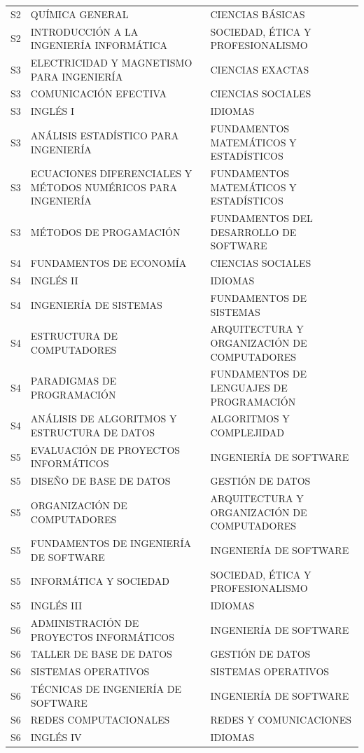 \documentclass[11pt,a4paper]{article}
\begin{document}
\begin{small}
\begin{longtable}{c >{\raggedright\arraybackslash}p{8.5cm} >{\raggedright\arraybackslash}p{5.5cm}}
S2 & QUÍMICA GENERAL & CIENCIAS BÁSICAS \\
S2 & INTRODUCCIÓN A LA INGENIERÍA INFORMÁTICA & SOCIEDAD, ÉTICA Y PROFESIONALISMO \\
S3 & ELECTRICIDAD Y MAGNETISMO PARA INGENIERÍA & CIENCIAS EXACTAS \\
S3 & COMUNICACIÓN EFECTIVA & CIENCIAS SOCIALES \\
S3 & INGLÉS I & IDIOMAS \\
S3 & ANÁLISIS ESTADÍSTICO PARA INGENIERÍA & FUNDAMENTOS MATEMÁTICOS Y ESTADÍSTICOS \\
S3 & ECUACIONES DIFERENCIALES Y MÉTODOS NUMÉRICOS PARA INGENIERÍA & FUNDAMENTOS MATEMÁTICOS Y ESTADÍSTICOS \\
S3 & MÉTODOS DE PROGAMACIÓN & FUNDAMENTOS DEL DESARROLLO DE SOFTWARE \\
S4 & FUNDAMENTOS DE ECONOMÍA & CIENCIAS SOCIALES \\
S4 & INGLÉS II & IDIOMAS \\
S4 & INGENIERÍA DE SISTEMAS & FUNDAMENTOS DE SISTEMAS \\
S4 & ESTRUCTURA DE COMPUTADORES & ARQUITECTURA Y ORGANIZACIÓN DE COMPUTADORES \\
S4 & PARADIGMAS DE PROGRAMACIÓN & FUNDAMENTOS DE LENGUAJES DE PROGRAMACIÓN \\
S4 & ANÁLISIS DE ALGORITMOS Y ESTRUCTURA DE DATOS & ALGORITMOS Y COMPLEJIDAD \\
S5 & EVALUACIÓN DE PROYECTOS INFORMÁTICOS & INGENIERÍA DE SOFTWARE \\
S5 & DISEÑO DE BASE DE DATOS & GESTIÓN DE DATOS \\
S5 & ORGANIZACIÓN DE COMPUTADORES & ARQUITECTURA Y ORGANIZACIÓN DE COMPUTADORES \\
S5 & FUNDAMENTOS DE INGENIERÍA DE SOFTWARE & INGENIERÍA DE SOFTWARE \\
S5 & INFORMÁTICA Y SOCIEDAD & SOCIEDAD, ÉTICA Y PROFESIONALISMO \\
S5 & INGLÉS III & IDIOMAS \\
S6 & ADMINISTRACIÓN DE PROYECTOS INFORMÁTICOS & INGENIERÍA DE SOFTWARE \\
S6 & TALLER DE BASE DE DATOS & GESTIÓN DE DATOS \\
S6 & SISTEMAS OPERATIVOS & SISTEMAS OPERATIVOS \\
S6 & TÉCNICAS DE INGENIERÍA DE SOFTWARE & INGENIERÍA DE SOFTWARE \\
S6 & REDES COMPUTACIONALES & REDES Y COMUNICACIONES \\
S6 & INGLÉS IV & IDIOMAS \\

\end{longtable}
\end{small}
\end{document}
